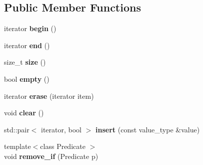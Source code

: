 \subsection*{Public Member Functions}
\begin{DoxyCompactItemize}
\item 
iterator {\bfseries begin} ()\hypertarget{classndn_1_1ContainerWithOnEmptySignal_a14163b6d4975e2fa5be61b651350cdc1}{}\label{classndn_1_1ContainerWithOnEmptySignal_a14163b6d4975e2fa5be61b651350cdc1}

\item 
iterator {\bfseries end} ()\hypertarget{classndn_1_1ContainerWithOnEmptySignal_a8057bdf3ce5f290abfd5b5fc26acd2e9}{}\label{classndn_1_1ContainerWithOnEmptySignal_a8057bdf3ce5f290abfd5b5fc26acd2e9}

\item 
size\+\_\+t {\bfseries size} ()\hypertarget{classndn_1_1ContainerWithOnEmptySignal_a868b36f1e23d670e5e6814da6883b949}{}\label{classndn_1_1ContainerWithOnEmptySignal_a868b36f1e23d670e5e6814da6883b949}

\item 
bool {\bfseries empty} ()\hypertarget{classndn_1_1ContainerWithOnEmptySignal_a94218489ec9624b9ba829544c1c3faa6}{}\label{classndn_1_1ContainerWithOnEmptySignal_a94218489ec9624b9ba829544c1c3faa6}

\item 
iterator {\bfseries erase} (iterator item)\hypertarget{classndn_1_1ContainerWithOnEmptySignal_af5bd772542596ce4449ab2d183be1f4d}{}\label{classndn_1_1ContainerWithOnEmptySignal_af5bd772542596ce4449ab2d183be1f4d}

\item 
void {\bfseries clear} ()\hypertarget{classndn_1_1ContainerWithOnEmptySignal_a522eeefbcf0891f2c656b2e92cf2a3d6}{}\label{classndn_1_1ContainerWithOnEmptySignal_a522eeefbcf0891f2c656b2e92cf2a3d6}

\item 
std\+::pair$<$ iterator, bool $>$ {\bfseries insert} (const value\+\_\+type \&value)\hypertarget{classndn_1_1ContainerWithOnEmptySignal_ac5112f2ee5bb90e9d36aa8593bc66f9c}{}\label{classndn_1_1ContainerWithOnEmptySignal_ac5112f2ee5bb90e9d36aa8593bc66f9c}

\item 
{\footnotesize template$<$class Predicate $>$ }\\void {\bfseries remove\+\_\+if} (Predicate p)\hypertarget{classndn_1_1ContainerWithOnEmptySignal_af8121f38bb489b0a719d71122070c5ef}{}\label{classndn_1_1ContainerWithOnEmptySignal_af8121f38bb489b0a719d71122070c5ef}

\end{DoxyCompactItemize}
